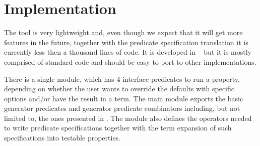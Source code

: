 
\section{Implementation}
\label{sec:impl}

The \plqc{} tool is very lightweight and, even though we expect that
it will get more features in the future, \plqc{} together with the predicate
specification translation it is currently less then a thousand lines
of \Prolog{} code.    
%
It is developed in \Yap~\Prolog{} but it is mostly comprised of
standard \Prolog{} code and should be easy to port to other
implementations.


There is a single \plqc{} module, which has 4 interface predicates to
run a property, depending on whether the user wants to override the defaults
with specific options and/or have the result in a term.
%
The main module exports the basic generator predicates and generator
predicate combinators including, but not limited to, the ones
presented in .
%
The module also defines the operators needed to write predicate
specifications together with the term expansion of such specifications
into testable properties.


